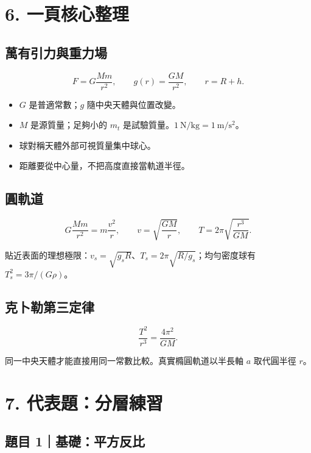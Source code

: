 \documentclass[11pt,a4paper]{article}
\providecommand{\tightlist}{%
  \setlength{\itemsep}{0pt}\setlength{\parskip}{0pt}}
\begin{document}
\section{6. 一頁核心整理}\label{ux4e00ux9801ux6838ux5fc3ux6574ux7406}

\subsection{萬有引力與重力場}\label{ux842cux6709ux5f15ux529bux8207ux91cdux529bux5834}

\[
F=G\frac{Mm}{r^2},
\qquad
g(r)=\frac{GM}{r^2},
\qquad
r=R+h.
\]

\begin{itemize}
\tightlist
\item
  \(G\) 是普適常數；\(g\) 隨中央天體與位置改變。
\item
  \(M\) 是源質量；足夠小的 \(m_t\) 是試驗質量。\(1\ \mathrm{N/kg}=1\ \mathrm{m/s^2}\)。
\item
  球對稱天體外部可視質量集中球心。
\item
  距離要從中心量，不把高度直接當軌道半徑。
\end{itemize}

\subsection{圓軌道}\label{ux5713ux8eccux9053}

\[
G\frac{Mm}{r^2}=m\frac{v^2}{r},
\qquad
v=\sqrt{\frac{GM}{r}},
\qquad
T=2\pi\sqrt{\frac{r^3}{GM}}.
\]

貼近表面的理想極限：\(v_s=\sqrt{g_sR}\)、\(T_s=2\pi\sqrt{R/g_s}\)；均勻密度球有 \(T_s^2=3\pi/(G\rho)\)。

\subsection{克卜勒第三定律}\label{ux514bux535cux52d2ux7b2cux4e09ux5b9aux5f8b}

\[
\frac{T^2}{r^3}=\frac{4\pi^2}{GM}.
\]

同一中央天體才能直接用同一常數比較。真實橢圓軌道以半長軸 \(a\) 取代圓半徑 \(r\)。

\section{7. 代表題：分層練習}\label{ux4ee3ux8868ux984cux5206ux5c64ux7df4ux7fd2}

\subsection{題目 1｜基礎：平方反比}\label{ux984cux76ee-1ux57faux790eux5e73ux65b9ux53cdux6bd4}
\end{document}

